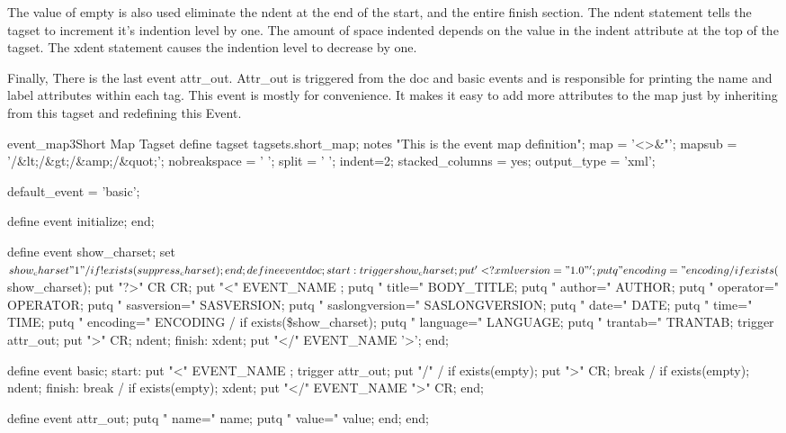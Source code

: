 The value of empty is also used eliminate the ndent at the end of the start, and the entire 
finish section.  The ndent statement tells the tagset to increment it's
indention level by one.  The amount of space indented depends on the 
value in the indent attribute at the top of the tagset.  The xdent 
statement causes the indention level to decrease by one.

Finally, There is the last event attr\_out.   Attr\_out is triggered 
from the doc and basic events and is responsible for printing 
the name and label attributes within each tag.   This event is
mostly for convenience.  It makes it easy to add more attributes
to the map just by inheriting from this tagset and redefining this
Event.


\begin{fvcode}{event_map3}{Short Map Tagset}
    define tagset tagsets.short_map;
        notes "This is the event map definition";
        map = '<>&"';
        mapsub = '/&lt;/&gt;/&amp;/&quot;';
        nobreakspace = ' ';
        split = ' ';
        indent=2;
        stacked_columns = yes;
        output_type = 'xml';

        default_event = 'basic';

        define event initialize;
        end;

        define event show_charset;
           set $show_charset "1" / if !exists(suppress_charset);
        end;

        define event doc;
            start:
                trigger show_charset;
                put '<?xml version="1.0"';
                putq " encoding=" encoding / if exists($show_charset);
                put "?>" CR CR;
                put "<" EVENT_NAME ;
                putq " title="        BODY_TITLE;
                putq " author="       AUTHOR;
                putq " operator="     OPERATOR;
                putq " sasversion="   SASVERSION;
                putq " saslongversion="   SASLONGVERSION;
                putq " date="         DATE;
                putq " time="         TIME;
                putq " encoding="     ENCODING / if exists(\$show_charset);
                putq " language="     LANGUAGE;
                putq " trantab="      TRANTAB;
                trigger attr_out;
                put ">" CR;
                ndent;
            finish:
                xdent;
                put "</" EVENT_NAME '>';
        end;

        define event basic;
            start:
                put "<" EVENT_NAME ;
                trigger attr_out;
                put "/" / if exists(empty);
                put ">" CR;
                break / if exists(empty);
                ndent;
            finish:
                break / if exists(empty);
                xdent;
                put "</" EVENT_NAME ">" CR;
        end;

       define event attr_out;
          putq " name=" name;
          putq " value=" value;
       end;
    end;

\end{fvcode}


